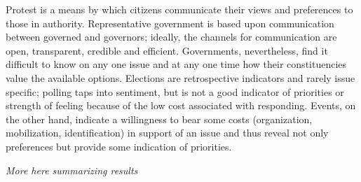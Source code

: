 Protest is a means by which citizens communicate their views and preferences to those in authority. Representative government is based upon communication between governed and governors; ideally, the channels for communication are open, transparent, credible and efficient. Governments, nevertheless, find it difficult to know on any one issue and at any one time how their constituencies value the available options. Elections are retrospective indicators and rarely issue specific; polling taps into sentiment, but is not a good indicator of priorities or strength of feeling because of the low cost associated with responding. Events, on the other hand, indicate a willingness to bear some costs (organization, mobilization, identification) in support of an issue and thus reveal not only preferences but provide some indication of priorities.
 
 



{\em More here summarizing results}
